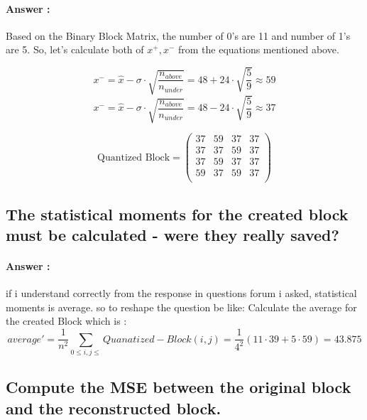 \documentclass[letterpaper, 12pt]{article}
\begin{document}
\paragraph{Answer :}
Based on the Binary Block Matrix, the number of 0's are 11 and number of 1's are 5. So, let's calculate both of $x^+,x^-$ from the equations mentioned above.

\[x^- = {\hat{x}-\sigma \cdot \sqrt{\frac{n_{above}}{n_{under}}}} = {48 +24 \cdot \sqrt{\frac{5}{9}}} \approx 59 \]
\[x^- = {\hat{x} - \sigma \cdot \sqrt{\frac{n_{above}}{n_{under}}}} = {48 -24 \cdot \sqrt{\frac{5}{9}}} \approx 37 \]

\[\text{Quantized Block} = \begin{pmatrix}
37 &59 &37 &37 \\
37 &37 &59 &37 \\
37 &59 &37 &37 \\
59 &37 &59 &37 \\
\end{pmatrix}\]
  
\subsection{The statistical moments for the created block must be calculated - were they really saved?}
\paragraph{Answer :}
if i understand correctly from the response in questions forum i asked, statistical moments is average. so to reshape the question be like:
Calculate the average for the created Block which is : 
\[average' = \frac{1}{n^2}\sum_{0\leq i,j\leq} Quanatized-Block(i,j) = \frac{1}{4^2}\left(11\cdot 39 + 5\cdot 59 \right) = 43.875\]

\subsection{Compute the MSE between the original block and the reconstructed block.}
\end{document}
